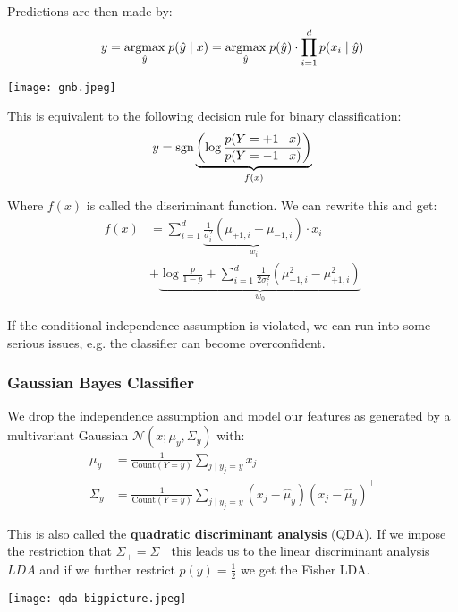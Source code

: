Predictions are then made by:
$$y = \underset{\hat y}{\text{argmax}} \; p(\hat y \; | \; x) = \underset{\hat y}{\text{argmax}} \; p(\hat y) \cdot \prod_{i=1}^d p(x_i \; | \; \hat y)$$

\begin{center}
	\texttt{[image: gnb.jpeg]}
\end{center}

This is equivalent to the following decision rule for binary classification:
$$y = \text{sgn} \underbrace{\left( \log \frac{p(Y = +1 \; | \; x)}{p(Y = -1 \; | \; x)} \right)}_{f(x)}$$

Where $f(x)$ is called the discriminant function. We can rewrite this and get:
\begin{align*}
f(x) &= \sum_{i=1}^d \underbrace{\frac{1}{\sigma_i^2} (\mu_{+1,i} - \mu_{-1,i})}_{w_i} \cdot x_i \\
&+ \underbrace{\log \frac{p}{1-p} + \sum_{i=1}^d \frac{1}{2 \sigma_i^2} (\mu_{-1, i}^2 - \mu_{+1, i}^2)}_{w_0}
\end{align*}

If the conditional independence assumption is violated, we can run into some serious issues, e.g. the classifier can become overconfident.

\subsubsection{Gaussian Bayes Classifier}

We drop the independence assumption and model our features as generated by a multivariant Gaussian $\mathcal{N}(x; \mu_y, \Sigma_y)$ with:
\begin{align*}
	\mu_{y} &= \frac{1}{\text{Count}(Y = y)} \sum_{j \; | \; y_j = y} x_{j}\\
	\Sigma_{y} &= \frac{1}{\text{Count}(Y = y)} \sum_{j \; | \; y_j = y} (x_{j} - \hat \mu_{y}) (x_{j} - \hat \mu_{y})^\top
\end{align*}

This is also called the \textbf{quadratic discriminant analysis} (QDA). If we impose the restriction that $\Sigma_+ = \Sigma_-$ this leads us to the linear discriminant analysis $LDA$ and if we further restrict $p(y) = \frac{1}{2}$ we get the Fisher LDA.

\begin{center}
	\texttt{[image: qda-bigpicture.jpeg]}
\end{center}


